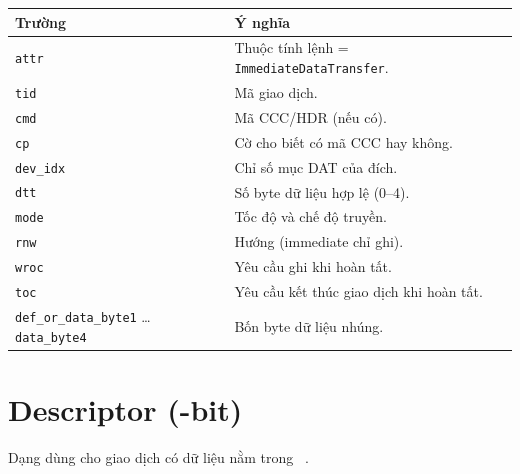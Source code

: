 \begin{longtable}{C{4.5cm} L{8.1cm}}
	\toprule
	\textbf{Trường}                                           & \textbf{Ý nghĩa}                                  \\
	\midrule
	\endhead
	\texttt{attr}                                             & Thuộc tính lệnh = \texttt{ImmediateDataTransfer}. \\
	\texttt{tid}                                              & Mã giao dịch.                                     \\
	\texttt{cmd}                                              & Mã CCC/HDR (nếu có).                              \\
	\texttt{cp}                                               & Cờ cho biết có mã CCC hay không.                  \\
	\texttt{dev\_idx}                                         & Chỉ số mục DAT của \Target{} đích.                \\
	\texttt{dtt}                                              & Số byte dữ liệu hợp lệ (0--4).                    \\
	\texttt{mode}                                             & Tốc độ và chế độ truyền.                          \\
	\texttt{rnw}                                              & Hướng (immediate chỉ ghi).                        \\
	\texttt{wroc}                                             & Yêu cầu ghi \ResponseDescriptor{} khi hoàn tất.   \\
	\texttt{toc}                                              & Yêu cầu kết thúc giao dịch khi hoàn tất.          \\
	\texttt{def\_or\_data\_byte1} \ldots \texttt{data\_byte4} & Bốn byte dữ liệu nhúng.                           \\
	\bottomrule
\end{longtable}

\section*{\RegularTransfer{} Descriptor (\CommandDescriptorWidth{}-bit)}

Dạng \RegularTransfer{} dùng cho giao dịch có dữ liệu nằm trong \TxRxFifo{}~\cite{mipi_i3c_tcri}.

